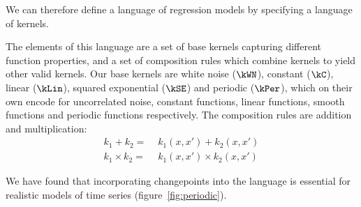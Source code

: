 We can therefore define a language of regression models by specifying a language of kernels.

The elements of this language are a set of  base kernels capturing different function properties, and a set of
composition rules which combine kernels to yield other valid kernels.
Our base kernels are white noise ($\kWN$), constant ($\kC$), linear ($\kLin$), squared exponential ($\kSE$) and periodic ($\kPer$), which on their own encode for uncorrelated noise, constant functions, linear functions, smooth functions and periodic functions respectively.
The composition rules are addition and multiplication:
\begin{align}
k_1 + k_2 =      & \,\, k_1(x,x') + k_2(x,x') \\
k_1 \times k_2 = & \,\, k_1(x,x') \times k_2(x,x')
\end{align}


We have found that incorporating changepoints into the language is essential for realistic models of time series (\eg figure~\ref{fig:periodic}).



